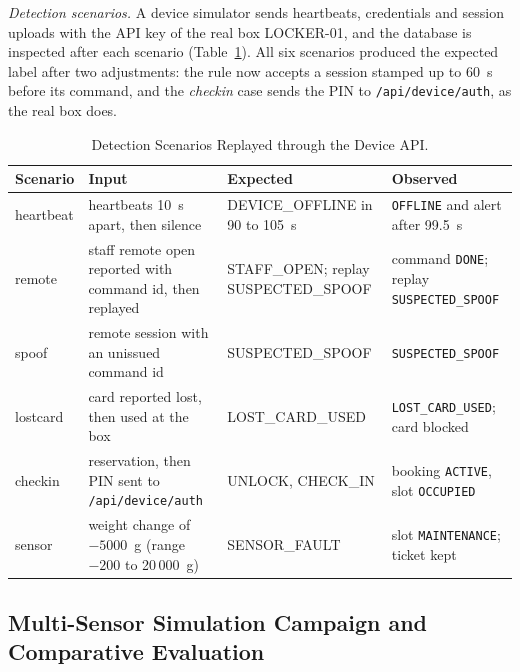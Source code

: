 \documentclass[journal,onecolumn]{IEEEtran}
\begin{document}
\textit{Detection scenarios.} A device simulator sends heartbeats, credentials and session uploads with the API key
of the real box LOCKER-01, and the database is inspected after each scenario (Table~\ref{tab:scen}). All six scenarios
produced the expected label after two adjustments: the rule now accepts a session stamped up to 60~s before its
command, and the \emph{checkin} case sends the PIN to \texttt{/api/device/auth}, as the real box does.

\begin{table}[!htbp]
\renewcommand{\arraystretch}{1.12}
\centering
\small
\caption{Detection Scenarios Replayed through the Device API.}
\label{tab:scen}
\vspace{3pt}
\begin{tabular}{l >{\raggedright\arraybackslash}p{4.8cm} >{\raggedright\arraybackslash}p{3.6cm} >{\raggedright\arraybackslash}p{5.2cm}}
\hline
Scenario & Input & Expected & Observed \\
\midrule
\addlinespace[2pt]
heartbeat & 6 heartbeats 10~s apart, then silence & DEVICE\_OFFLINE in 90 to 105~s & \texttt{OFFLINE} and alert after 99.5~s \\[2pt]
remote    & staff remote open reported with command id, then replayed & STAFF\_OPEN; replay SUSPECTED\_SPOOF & command \texttt{DONE}; replay \texttt{SUSPECTED\_SPOOF} \\[2pt]
spoof     & remote session with an unissued command id & SUSPECTED\_SPOOF & \texttt{SUSPECTED\_SPOOF} \\[2pt]
lostcard  & card reported lost, then used at the box & LOST\_CARD\_USED & \texttt{LOST\_CARD\_USED}; card blocked \\[2pt]
checkin   & reservation, then PIN sent to \texttt{/api/device/auth} & UNLOCK, CHECK\_IN & booking \texttt{ACTIVE}, slot \texttt{OCCUPIED} \\[2pt]
sensor    & weight change of $-5000$~g (range $-200$ to 20\,000~g) & SENSOR\_FAULT & slot \texttt{MAINTENANCE}; ticket kept \\
\hline
\end{tabular}
\end{table}

\subsection{Multi-Sensor Simulation Campaign and Comparative Evaluation}
\label{sec:sim_eval}
\end{document}
